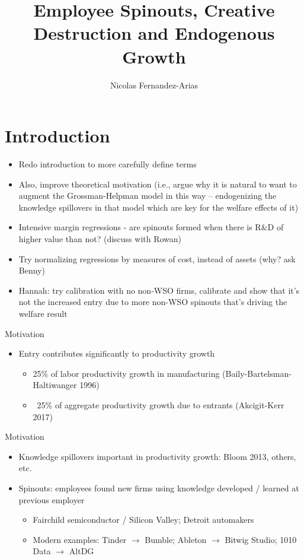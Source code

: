 \documentclass[english,usenames,dvipsnames]{beamer}
\title{Employee Spinouts, Creative Destruction and Endogenous Growth}
\author{Nicolas Fernandez-Arias}
\begin{document}
\maketitle

\section{Introduction}

\begin{frame}
\begin{itemize}
	\item Redo introduction to more carefully define terms
	\item Also, improve theoretical motivation (i.e., argue why it is natural to want to augment the Grossman-Helpman model in this way -- endogenizing the knowledge spillovers in that model which are key for the welfare effects of it)
	\item Intensive margin regressions - are spinouts formed when there is R\&D of higher value than not? (discuss with Rowan)
	\item Try normalizing regressions by measures of cost, instead of assets (why? ask Benny)
	\item Hannah: try calibration with no non-WSO firms, calibrate and show that it's not the increased entry due to more non-WSO spinouts that's driving the welfare result
\end{itemize}
\end{frame}

\begin{frame}{Motivation}
\begin{itemize}
	\item Entry contributes significantly to productivity growth
	\begin{itemize}
		\item 25\% of labor productivity growth in manufacturing (Baily-Bartelsman-Haltiwanger 1996)
		\item ~25\% of aggregate productivity growth due to entrants (Akcigit-Kerr 2017)
	\end{itemize}
\end{itemize}
\end{frame}

\begin{frame}{Motivation}\label{motivation_spillovers}
\begin{itemize}
	\item Knowledge spillovers important in productivity growth: Bloom 2013, others, etc.
	\item Spinouts: employees found new firms using knowledge developed / learned at previous employer  \hyperlink{spinouts_facts_from_literature}{}
	\begin{itemize}
		\item Fairchild semiconductor / Silicon Valley; Detroit automakers
		\item Modern examples: Tinder $\rightarrow$ Bumble; Ableton $\rightarrow$ Bitwig Studio; 1010 Data $\rightarrow$ AltDG 
	\end{itemize}
\end{itemize}
\end{frame}
\end{document}
